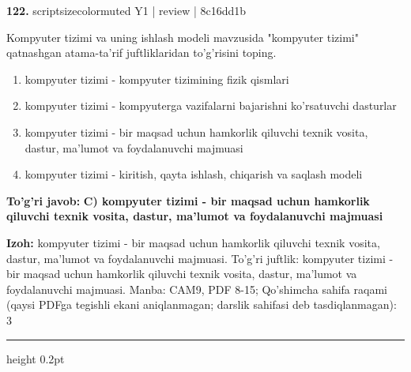 \documentclass[10pt,a4paper]{article}
\begin{document}
{\bfseries\sffamily\color{ink} 122.} {scriptsizecolor{muted} Y1 | review | 8c16dd1b}
\par
Kompyuter tizimi va uning ishlash modeli mavzusida "kompyuter tizimi" qatnashgan atama-ta'rif juftliklaridan to'g'risini toping.
\begin{enumerate}[label=\Alph*),leftmargin=9mm]
\item kompyuter tizimi - kompyuter tizimining fizik qismlari
\item kompyuter tizimi - kompyuterga vazifalarni bajarishni ko'rsatuvchi dasturlar
\item kompyuter tizimi - bir maqsad uchun hamkorlik qiluvchi texnik vosita, dastur, ma'lumot va foydalanuvchi majmuasi
\item kompyuter tizimi - kiritish, qayta ishlash, chiqarish va saqlash modeli
\end{enumerate}
\begin{tcolorbox}[enhanced,breakable,colback=teal!4,colframe=teal!60!black,boxrule=0.45pt,arc=1.2mm,left=2.7mm,right=2.7mm,top=1.8mm,bottom=1.8mm,before skip=2mm,after skip=2mm]
{\bfseries\sffamily\color{teal}To'g'ri javob:} \textbf{C) kompyuter tizimi - bir maqsad uchun hamkorlik qiluvchi texnik vosita, dastur, ma'lumot va foydalanuvchi majmuasi}
\par\smallskip
{\bfseries Izoh:} kompyuter tizimi - bir maqsad uchun hamkorlik qiluvchi texnik vosita, dastur, ma'lumot va foydalanuvchi majmuasi. To'g'ri juftlik: kompyuter tizimi - bir maqsad uchun hamkorlik qiluvchi texnik vosita, dastur, ma'lumot va foydalanuvchi majmuasi. Manba: CAM9, PDF 8-15; Qo'shimcha sahifa raqami (qaysi PDFga tegishli ekani aniqlanmagan; darslik sahifasi deb tasdiqlanmagan): 3
\end{tcolorbox}
\vspace{2mm}\hrule height 0.2pt\vspace{3mm}
\end{document}
